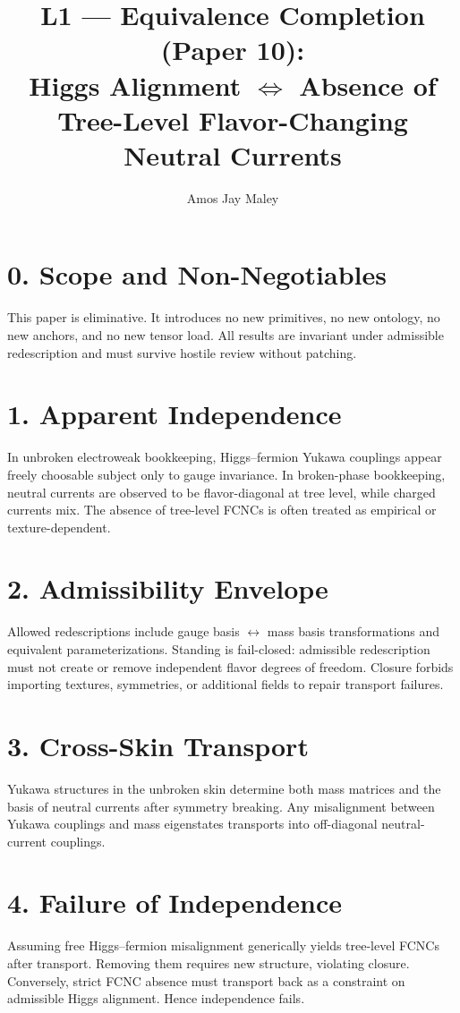 ﻿\documentclass[11pt]{article}
\title{L1 --- Equivalence Completion (Paper 10):\\
Higgs Alignment $\Longleftrightarrow$ Absence of Tree-Level Flavor-Changing Neutral Currents}
\author{Amos Jay Maley}
\date{}
\begin{document}
\maketitle

\section*{0. Scope and Non-Negotiables}
This paper is eliminative. It introduces no new primitives, no new ontology, no new anchors, and no new tensor load.
All results are invariant under admissible redescription and must survive hostile review without patching.

\section*{1. Apparent Independence}
In unbroken electroweak bookkeeping, Higgs--fermion Yukawa couplings appear freely choosable subject only to gauge invariance.
In broken-phase bookkeeping, neutral currents are observed to be flavor-diagonal at tree level, while charged currents mix.
The absence of tree-level FCNCs is often treated as empirical or texture-dependent.

\section*{2. Admissibility Envelope}
Allowed redescriptions include gauge basis $\leftrightarrow$ mass basis transformations and equivalent parameterizations.
Standing is fail-closed: admissible redescription must not create or remove independent flavor degrees of freedom.
Closure forbids importing textures, symmetries, or additional fields to repair transport failures.

\section*{3. Cross-Skin Transport}
Yukawa structures in the unbroken skin determine both mass matrices and the basis of neutral currents after symmetry breaking.
Any misalignment between Yukawa couplings and mass eigenstates transports into off-diagonal neutral-current couplings.

\section*{4. Failure of Independence}
Assuming free Higgs--fermion misalignment generically yields tree-level FCNCs after transport.
Removing them requires new structure, violating closure.
Conversely, strict FCNC absence must transport back as a constraint on admissible Higgs alignment.
Hence independence fails.
\end{document}
